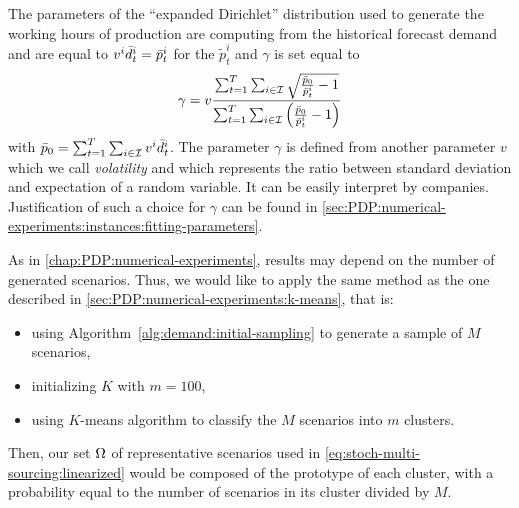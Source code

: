The parameters of the ``expanded Dirichlet'' distribution used to generate the working hours of production are computing from the historical forecast demand and are equal to $v^i\bar{d}_t^i=\bar{p}_t^i$ for the $\tilde{p}_t^i$ and $\gamma$ is set equal to
\begin{equation}
  \gamma
  =
  v\frac
  {\sum_{t=1}^{\horizon}\sum_{i\in\REF} \sqrt{\frac{\bar{p}_0}{\bar{p}_t^i}-1}}
  {\sum_{t=1}^{\horizon}\sum_{i\in\REF} \bracket{\frac{\bar{p}_0}{\bar{p}_t^i}-1}}
\end{equation}
with $\bar{p}_0 = \sum_{t=1}^{T}\sum_{i\in\mathcal{I}}v^i\bar{d}_t^i$.
The parameter $\gamma$ is defined from another parameter $v$ which we call \emph{volatility} and which represents the ratio between standard deviation and expectation of a random variable.
It can be easily interpret by companies.
Justification of such a choice for $\gamma$ can be found in \cref{sec:PDP:numerical-experiments:instances:fitting-parameters}.


As in \cref{chap:PDP:numerical-experiments}, results may depend on the number of generated scenarios.
Thus, we would like to apply the same method as the one described in \cref{sec:PDP:numerical-experiments:k-means}, that is:
\begin{itemize}
  \item using Algorithm~\ref{alg:demand:initial-sampling} to generate a sample of $M$ scenarios,
  \item initializing $K$ with $m=100$,
  \item using $K$-means algorithm to classify the $M$ scenarios into $m$ clusters.
\end{itemize}
Then, our set $\Omega$ of representative scenarios used in \cref{eq:stoch-multi-sourcing:linearized} would be composed of the prototype of each cluster, with a probability equal to the number of scenarios in its cluster divided by $M$.





